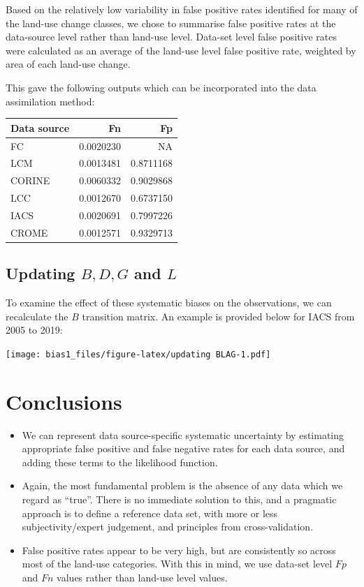 \documentclass[
]{book}
\providecommand{\tightlist}{%
  \setlength{\itemsep}{0pt}\setlength{\parskip}{0pt}}
\begin{document}
Based on the relatively low variability in false positive rates identified for many of the land-use change classes, we chose to summarise false positive rates at the data-source level rather than land-use level. Data-set level false positive rates were calculated as an average of the land-use level false positive rate, weighted by area of each land-use change.

This gave the following outputs which can be incorporated into the data assimilation method:

\begin{tabular}{l|r|r}
\hline
Data source & Fn & Fp\\
\hline
FC & 0.0020230 & NA\\
\hline
LCM & 0.0013481 & 0.8711168\\
\hline
CORINE & 0.0060332 & 0.9029868\\
\hline
LCC & 0.0012670 & 0.6737150\\
\hline
IACS & 0.0020691 & 0.7997226\\
\hline
CROME & 0.0012571 & 0.9329713\\
\hline
\end{tabular}

\hypertarget{updating-b-d-g-and-l}{%
\subsection{\texorpdfstring{Updating \(B, D, G\) and \(L\)}{Updating B, D, G and L}}\label{updating-b-d-g-and-l}}

To examine the effect of these systematic biases on the observations, we can recalculate the \(B\) transition matrix. An example is provided below for IACS from 2005 to 2019:

\texttt{[image: bias1\_files/figure-latex/updating BLAG-1.pdf]}

\hypertarget{conclusions}{%
\section{Conclusions}\label{conclusions}}

\begin{itemize}
\tightlist
\item
  We can represent data source-specific systematic uncertainty by estimating appropriate false positive and false negative rates for each data source, and adding these terms to the likelihood function.
\item
  Again, the most fundamental problem is the absence of any data which we regard as ``true''. There is no immediate solution to this, and a pragmatic approach is to define a reference data set, with more or less subjectivity/expert judgement, and principles from cross-validation.
\item
  False positive rates appear to be very high, but are consistently so across most of the land-use categories. With this in mind, we use data-set level \(Fp\) and \(Fn\) values rather than land-use level values.
\end{itemize}
\end{document}

